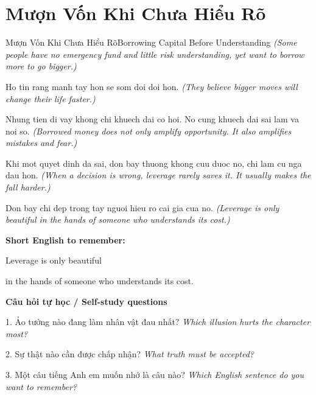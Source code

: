 \section{Mượn Vốn Khi Chưa Hiểu Rõ}
\begin{truyen}{Mượn Vốn Khi Chưa Hiểu Rõ}{Borrowing Capital Before Understanding}
\textit{(Some people have no emergency fund and little risk understanding, yet want to borrow more to go bigger.)}

Ho tin rang manh tay hon se som doi doi hon.
\textit{(They believe bigger moves will change their life faster.)}

Nhung tien di vay khong chi khuech dai co hoi. No cung khuech dai sai lam va noi so.
\textit{(Borrowed money does not only amplify opportunity. It also amplifies mistakes and fear.)}

Khi mot quyet dinh da sai, don bay thuong khong cuu duoc no, chi lam cu nga dau hon.
\textit{(When a decision is wrong, leverage rarely saves it. It usually makes the fall harder.)}

\end{truyen}

\begin{baihoc}
Don bay chi dep trong tay nguoi hieu ro cai gia cua no.
\textit{(Leverage is only beautiful in the hands of someone who understands its cost.)}
\end{baihoc}

\begin{ghinhoanh}
\textbf{Short English to remember:}

Leverage is only beautiful

in the hands of someone who understands its cost.

\end{ghinhoanh}

\begin{tuhocnhanh}
\textbf{Câu hỏi tự học / Self-study questions}

1. Ảo tưởng nào đang làm nhân vật đau nhất? \textit{Which illusion hurts the character most?}

2. Sự thật nào cần được chấp nhận? \textit{What truth must be accepted?}

3. Một câu tiếng Anh em muốn nhớ là câu nào? \textit{Which English sentence do you want to remember?}
\end{tuhocnhanh}
\ngancach

